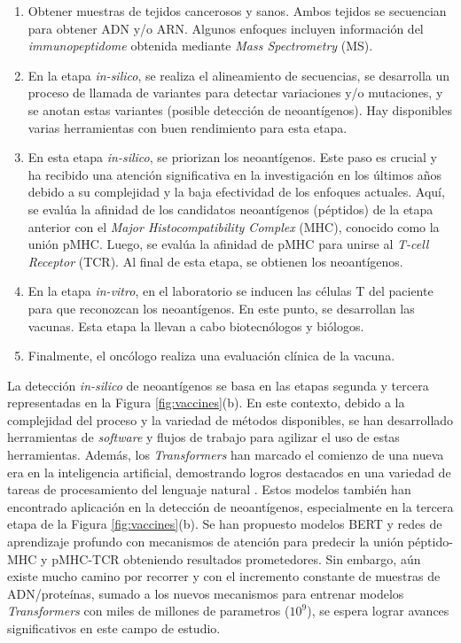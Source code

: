 \begin{enumerate}
	\item Obtener muestras de tejidos cancerosos y sanos. Ambos tejidos se secuencian para obtener ADN y/o ARN. Algunos enfoques incluyen información del \textit{immunopeptidome} obtenida mediante \textit{Mass Spectrometry} (MS).
	\item En la etapa \textit{in-silico}, se realiza el alineamiento de secuencias, se desarrolla un proceso de llamada de variantes para detectar variaciones y/o mutaciones, y se anotan estas variantes (posible detección de neoantígenos). Hay disponibles varias herramientas con buen rendimiento para esta etapa.
	\item En esta etapa \textit{in-silico}, se priorizan los neoantígenos. Este paso es crucial y ha recibido una atención significativa en la investigación en los últimos años debido a su complejidad y la baja efectividad de los enfoques actuales. Aquí, se evalúa la afinidad de los candidatos neoantígenos (péptidos) de la etapa anterior con el \textit{Major Histocompatibility Complex} (MHC), conocido como la unión pMHC. Luego, se evalúa la afinidad de pMHC para unirse al \textit{T-cell Receptor} (TCR). Al final de esta etapa, se obtienen los neoantígenos.
	\item En la etapa \textit{in-vitro}, en el laboratorio se inducen las células T del paciente para que reconozcan los neoantígenos. En este punto, se desarrollan las vacunas. Esta etapa la llevan a cabo biotecnólogos y biólogos.
	\item Finalmente, el oncólogo realiza una evaluación clínica de la vacuna.
	
\end{enumerate}

La detección \textit{in-silico} de neoantígenos se basa en las etapas segunda y tercera representadas en la Figura \ref{fig:vaccines}(b). En este contexto, debido a la complejidad del proceso y la variedad de métodos disponibles, se han desarrollado herramientas de \textit{software} y flujos de trabajo para agilizar el uso de estas herramientas. Además, los \textit{Transformers} han marcado el comienzo de una nueva era en la inteligencia artificial, demostrando logros destacados en una variedad de tareas de procesamiento del lenguaje natural  \citep{patwardhan2023transformers}. Estos modelos también han encontrado aplicación en la detección de neoantígenos, especialmente en la tercera etapa de la Figura \ref{fig:vaccines}(b). Se han propuesto modelos BERT y redes de aprendizaje profundo con mecanismos de atención para predecir la unión péptido-MHC y pMHC-TCR obteniendo resultados prometedores. Sin embargo, aún existe mucho camino por recorrer y con el incremento constante de muestras de ADN/proteínas, sumado a los nuevos mecanismos para entrenar modelos \textit{Transformers} con miles de millones de parametros ($10^9$), se espera lograr avances significativos en este campo de estudio.


